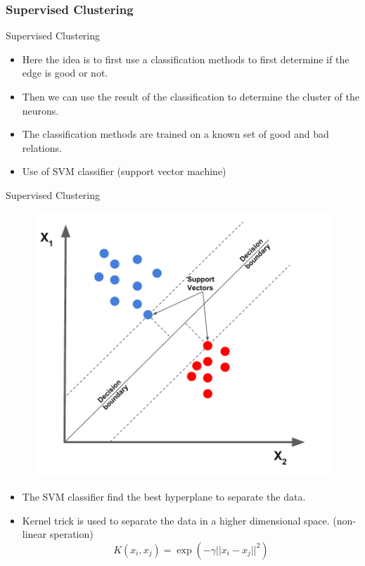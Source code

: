 \documentclass[numbering=fraction]{beamer}
\begin{document}
\subsubsection{Supervised Clustering}
\begin{frame}{Supervised Clustering}
    \begin{itemize}
        \item Here the idea is to first use a classification methods to first determine if the edge is good or not.
        \item Then we can use the result of the classification to determine the cluster of the neurons.
        \item The classification methods are trained on a known set of good and bad relations.
        \item Use of SVM classifier (support vector machine)
    \end{itemize}
\end{frame}
\begin{frame}{Supervised Clustering}
    \begin{minipage}{.48\textwidth}
        \begin{figure}[H]
            \centering
            \includegraphics[width=1\linewidth]{./figure/support-vectors-and-maximum-margin.png}
        \end{figure}
    \end{minipage}
    \begin{minipage}{.48\textwidth}
        \begin{itemize}
            \item The SVM classifier find the best hyperplane to separate the data.
            \item Kernel trick is used to separate the data in a higher dimensional space. (non-linear speration)
                  $$K(x_i, x_j) = \exp(-\gamma ||x_i - x_j||^2)$$

        \end{itemize}
    \end{minipage}
\end{frame}
\end{document}
